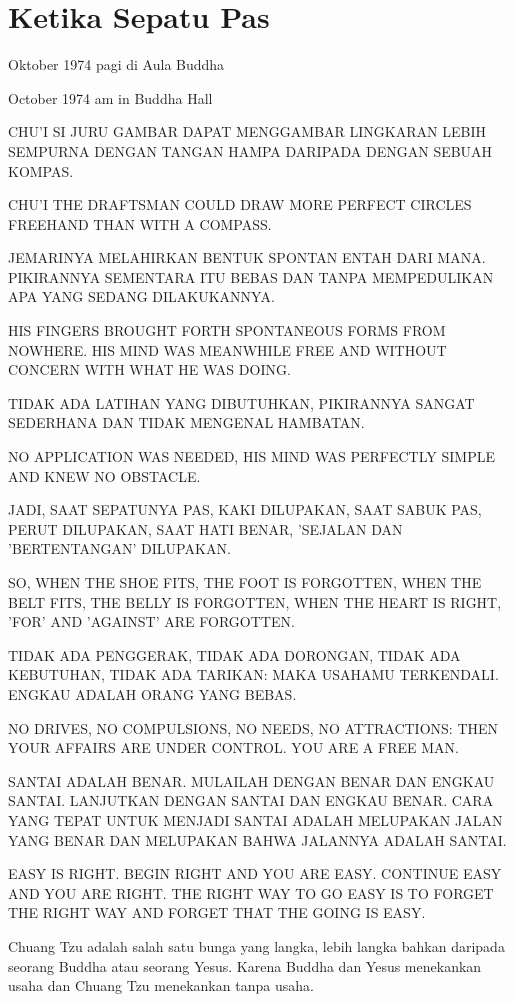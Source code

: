 \chapter{Ketika Sepatu Pas}

 Oktober 1974 pagi di Aula Buddha

 October 1974 am in Buddha Hall

\bahasa
CHU'I SI JURU GAMBAR DAPAT MENGGAMBAR LINGKARAN LEBIH SEMPURNA DENGAN TANGAN HAMPA DARIPADA DENGAN SEBUAH KOMPAS.

\english
CHU'I THE DRAFTSMAN COULD DRAW MORE PERFECT CIRCLES FREEHAND THAN WITH A COMPASS.

\bahasa
JEMARINYA MELAHIRKAN BENTUK SPONTAN ENTAH DARI MANA. PIKIRANNYA SEMENTARA ITU BEBAS DAN TANPA MEMPEDULIKAN APA YANG SEDANG DILAKUKANNYA.

\english
HIS FINGERS BROUGHT FORTH SPONTANEOUS FORMS FROM NOWHERE. HIS MIND WAS MEANWHILE FREE AND WITHOUT CONCERN WITH WHAT HE WAS DOING.

\bahasa
TIDAK ADA LATIHAN YANG DIBUTUHKAN, PIKIRANNYA SANGAT SEDERHANA DAN TIDAK MENGENAL HAMBATAN.

\english
NO APPLICATION WAS NEEDED, HIS MIND WAS PERFECTLY SIMPLE AND KNEW NO OBSTACLE.

\bahasa
JADI, SAAT SEPATUNYA PAS, KAKI DILUPAKAN, SAAT SABUK PAS, PERUT DILUPAKAN, SAAT HATI BENAR, 'SEJALAN DAN 'BERTENTANGAN' DILUPAKAN.

\english
SO, WHEN THE SHOE FITS, THE FOOT IS FORGOTTEN, WHEN THE BELT FITS, THE BELLY IS FORGOTTEN, WHEN THE HEART IS RIGHT, 'FOR' AND 'AGAINST' ARE FORGOTTEN.

\bahasa
TIDAK ADA PENGGERAK, TIDAK ADA DORONGAN, TIDAK ADA KEBUTUHAN, TIDAK ADA TARIKAN: MAKA USAHAMU TERKENDALI. ENGKAU ADALAH ORANG YANG BEBAS.

\english
NO DRIVES, NO COMPULSIONS, NO NEEDS, NO ATTRACTIONS: THEN YOUR AFFAIRS ARE UNDER CONTROL. YOU ARE A FREE MAN.

\bahasa
SANTAI ADALAH BENAR. MULAILAH DENGAN BENAR DAN ENGKAU SANTAI. LANJUTKAN DENGAN SANTAI DAN ENGKAU BENAR. CARA YANG TEPAT UNTUK MENJADI SANTAI ADALAH MELUPAKAN JALAN YANG BENAR DAN MELUPAKAN BAHWA JALANNYA ADALAH SANTAI.

\english
EASY IS RIGHT. BEGIN RIGHT AND YOU ARE EASY. CONTINUE EASY AND YOU ARE RIGHT. THE RIGHT WAY TO GO EASY IS TO FORGET THE RIGHT WAY AND FORGET THAT THE GOING IS EASY.

\bahasa
Chuang Tzu adalah salah satu bunga yang langka, lebih langka bahkan daripada seorang Buddha atau seorang Yesus. Karena Buddha dan Yesus menekankan usaha dan Chuang Tzu menekankan tanpa usaha.

